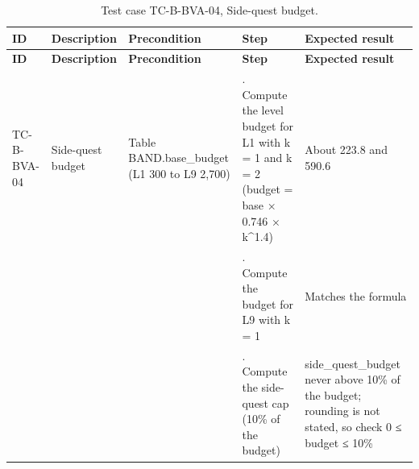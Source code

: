 {\small
\begin{longtable}{|>{\raggedright\arraybackslash}p{}|>{\raggedright\arraybackslash}p{}|>{\raggedright\arraybackslash}p{}|>{\raggedright\arraybackslash}p{}|>{\raggedright\arraybackslash}p{}|}
\caption{Test case TC-B-BVA-04, Side-quest budget.} \\
\hline
\textbf{ID} & \textbf{Description} & \textbf{Precondition} & \textbf{Step} & \textbf{Expected result} \\ \hline
\endfirsthead
\hline
\textbf{ID} & \textbf{Description} & \textbf{Precondition} & \textbf{Step} & \textbf{Expected result} \\ \hline
\endhead
TC-B-BVA-04 & Side-quest budget & Table BAND.base\_budget (L1 300 to L9 2,700) & 1. Compute the level budget for L1 with k = 1 and k = 2 (budget = base × 0.746 × k\textasciicircum{}1.4) & About 223.8 and 590.6 \\ \hline
 &  &  & 2. Compute the budget for L9 with k = 1 & Matches the formula \\ \hline
 &  &  & 3. Compute the side-quest cap (10\% of the budget) & side\_quest\_budget never above 10\% of the budget; rounding is not stated, so check 0 ≤ budget ≤ 10\% \\ \hline
\end{longtable}
}

